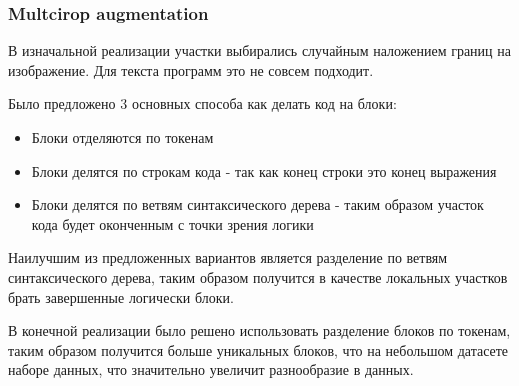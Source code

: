 \documentclass[../part_2.tex]{subfiles}
\begin{document}
    \subsubsection{Multcirop augmentation}
    \par В изначальной реализации участки выбирались случайным наложением границ на изображение. Для текста программ это не совсем подходит.
    \par Было предложено 3 основных способа как делать код на блоки:
    \begin{itemize}
        \item Блоки отделяются по токенам
        \item Блоки делятся по строкам кода - так как конец строки это конец выражения
        \item Блоки делятся по ветвям синтаксического дерева - таким образом участок кода будет оконченным с точки зрения логики
    \end{itemize}
    \par Наилучшим из предложенных вариантов является разделение по ветвям синтаксического дерева, таким образом получится в качестве локальных участков брать завершенные логически блоки. %
    \par В конечной реализации было решено использовать разделение блоков по токенам, таким образом получится больше уникальных блоков, что на небольшом датасете наборе данных, что значительно увеличит разнообразие в данных.
\end{document}
